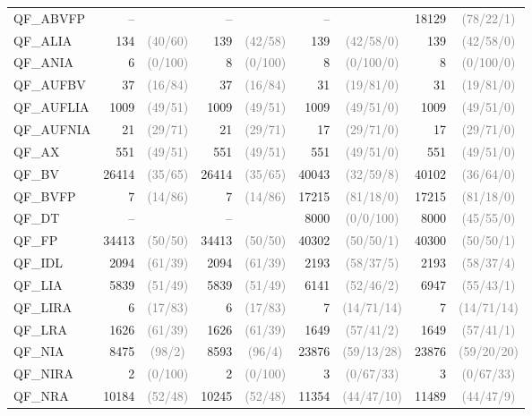 \documentclass[dvipsnames,table,twoside,11pt]{article}
\newcommand{\gray}[1]{\textcolor{gray}{#1}}
\begin{document}
\begin{table}
{\begin{tabular}{lr@{\hskip3pt}cr@{\hskip3pt}cr@{\hskip3pt}cr@{\hskip3pt}c}
    QF\_ABVFP & -- & & -- & & -- & & 18129 & \gray{(78/22/1)}\\
    QF\_ALIA & 134 & \gray{(40/60)} & 139 & \gray{(42/58)} & 139 & \gray{(42/58/0)} & 139 & \gray{(42/58/0)}\\
    QF\_ANIA & 6 & \gray{(0/100)} & 8 & \gray{(0/100)} & 8 & \gray{(0/100/0)} & 8 & \gray{(0/100/0)}\\
    QF\_AUFBV & 37 & \gray{(16/84)} & 37 & \gray{(16/84)} & 31 & \gray{(19/81/0)} & 31 & \gray{(19/81/0)}\\
    QF\_AUFLIA & 1009 & \gray{(49/51)} & 1009 & \gray{(49/51)} & 1009 & \gray{(49/51/0)} & 1009 & \gray{(49/51/0)}\\
    QF\_AUFNIA & 21 & \gray{(29/71)} & 21 & \gray{(29/71)} & 17 & \gray{(29/71/0)} & 17 & \gray{(29/71/0)}\\
    QF\_AX & 551 & \gray{(49/51)} & 551 & \gray{(49/51)} & 551 & \gray{(49/51/0)} & 551 & \gray{(49/51/0)}\\
    QF\_BV & 26414 & \gray{(35/65)} & 26414 & \gray{(35/65)} & 40043 & \gray{(32/59/8)} & 40102 & \gray{(36/64/0)}\\
    QF\_BVFP & 7 & \gray{(14/86)} & 7 & \gray{(14/86)} & 17215 & \gray{(81/18/0)} & 17215 & \gray{(81/18/0)}\\
    QF\_DT & -- & & -- & & 8000 & \gray{(0/0/100)} & 8000 & \gray{(45/55/0)}\\
    QF\_FP & 34413 & \gray{(50/50)} & 34413 & \gray{(50/50)} & 40302 & \gray{(50/50/1)} & 40300 & \gray{(50/50/1)}\\
    QF\_IDL & 2094 & \gray{(61/39)} & 2094 & \gray{(61/39)} & 2193 & \gray{(58/37/5)} & 2193 & \gray{(58/37/4)}\\
    QF\_LIA & 5839 & \gray{(51/49)} & 5839 & \gray{(51/49)} & 6141 & \gray{(52/46/2)} & 6947 & \gray{(55/43/1)}\\
    QF\_LIRA & 6 & \gray{(17/83)} & 6 & \gray{(17/83)} & 7 & \gray{(14/71/14)} & 7 & \gray{(14/71/14)}\\
    QF\_LRA & 1626 & \gray{(61/39)} & 1626 & \gray{(61/39)} & 1649 & \gray{(57/41/2)} & 1649 & \gray{(57/41/1)}\\
    QF\_NIA & 8475 & \gray{(98/2)} & 8593 & \gray{(96/4)} & 23876 & \gray{(59/13/28)} & 23876 & \gray{(59/20/20)}\\
    QF\_NIRA & 2 & \gray{(0/100)} & 2 & \gray{(0/100)} & 3 & \gray{(0/67/33)} & 3 & \gray{(0/67/33)}\\
    QF\_NRA & 10184 & \gray{(52/48)} & 10245 & \gray{(52/48)} & 11354 & \gray{(44/47/10)} & 11489 & \gray{(44/47/9)}\\

\end{tabular}}
\end{table}
\end{document}
